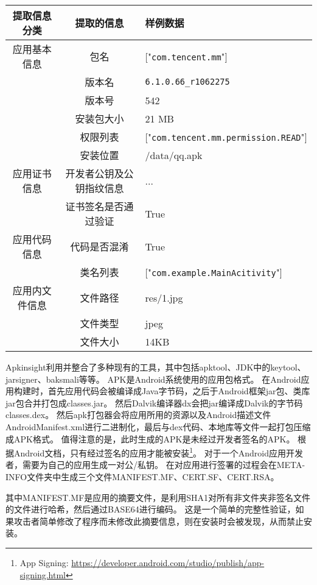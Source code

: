 \begin{table}
	\centering
	\begin{tabularx}{\textwidth}{|c|c|X|}
		\hline
		提取信息分类 & 提取的信息 & 样例数据\\
		\hline
		应用基本信息 & 包名 & ["\texttt{com.tencent.mm}"]\\
		& 版本名 & \texttt{6.1.0.66\_r1062275}\\
		& 版本号 & 542\\
		& 安装包大小 & 21 MB\\
		& 权限列表 & ["\texttt{com.tencent.mm.permission.READ}"]\\
		& 安装位置 & /data/qq.apk\\
		\hline
		应用证书信息 & 开发者公钥及公钥指纹信息 & ...\\
		& 证书签名是否通过验证 & True\\
		\hline
		应用代码信息 & 代码是否混淆 & True\\
		& 类名列表 & ["\texttt{com.example.MainAcitivity}"]\\
		\hline
		应用内文件信息 & 文件路径 & res/1.jpg\\
		& 文件类型 & jpeg\\
		& 文件大小 & 14KB\\
		\hline
	\end{tabularx}
\end{table}


Apkinsight利用并整合了多种现有的工具，其中包括apktool、JDK中的keytool、jarsigner、baksmali等等。
APK是Android系统使用的应用包格式。
在Android应用构建时，首先应用代码会被编译成Java字节码，之后于Android框架jar包、类库jar包合并打包成classes.jar。
然后Dalvik编译器dx会把jar编译成Dalvik的字节码classes.dex。
然后apk打包器会将应用所用的资源以及Android描述文件AndroidManifest.xml进行二进制化，最后与dex代码、本地库等文件一起打包压缩成APK格式。
值得注意的是，此时生成的APK是未经过开发者签名的APK。
根据Android文档，只有经过签名的应用才能被安装\footnote{App Signing: \url{https://developer.android.com/studio/publish/app-signing.html}}。
对于一个Android应用开发者，需要为自己的应用生成一对公/私钥。
在对应用进行签署的过程会在META-INFO文件夹中生成三个文件MANIFEST.MF、CERT.SF、CERT.RSA。

其中MANIFEST.MF是应用的摘要文件，是利用SHA1对所有非文件夹非签名文件的文件进行哈希，然后通过BASE64进行编码。
这是一个简单的完整性验证，如果攻击者简单修改了程序而未修改此摘要信息，则在安装时会被发现，从而禁止安装。

